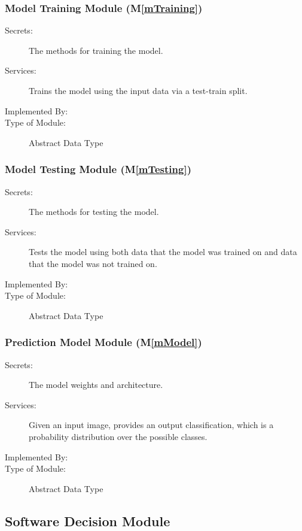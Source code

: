 \documentclass[12pt, titlepage]{article}
\newcommand{\mref}[1]{M\ref{#1}}
\begin{document}
\subsubsection{Model Training Module (\mref{mTraining})}

\begin{description}
\item[Secrets:] The methods for training the model.
\item[Services:] Trains the model using the input data via a test-train split.
\item[Implemented By:] \progname{}
\item[Type of Module:] Abstract Data Type
\end{description}

\subsubsection{Model Testing Module (\mref{mTesting})}

\begin{description}
\item[Secrets:] The methods for testing the model.
\item[Services:] Tests the model using both data that the model was trained on
and data that the model was not trained on.
\item[Implemented By:] \progname{}
\item[Type of Module:] Abstract Data Type
\end{description}

\subsubsection{Prediction Model Module (\mref{mModel})}

\begin{description}
\item[Secrets:] The model weights and architecture.
\item[Services:] Given an input image, provides an output classification, which
is a probability distribution over the possible classes.
\item[Implemented By:] \progname{}
\item[Type of Module:] Abstract Data Type
\end{description}

\subsection{Software Decision Module}
\end{document}
